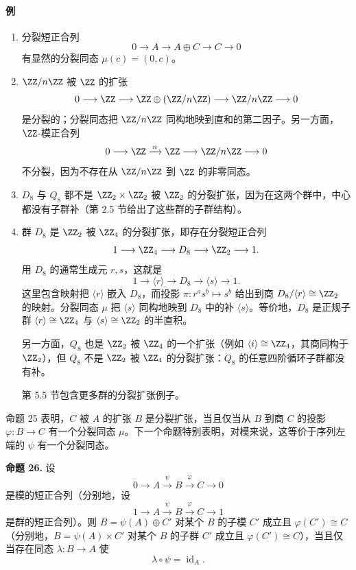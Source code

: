 \paragraph{例}
\begin{enumerate}[label=(\arabic*)]
\item 分裂短正合列
\[
0\longrightarrow A\longrightarrow A\oplus C\longrightarrow C\longrightarrow0
\]
有显然的分裂同态 $\mu(c)=(0,c)$。

\item $\ZZ/n\ZZ$ 被 $\ZZ$ 的扩张
\[
0\longrightarrow \ZZ\longrightarrow \ZZ\oplus(\ZZ/n\ZZ)\longrightarrow \ZZ/n\ZZ\longrightarrow0
\]
是分裂的；分裂同态把 $\ZZ/n\ZZ$ 同构地映到直和的第二因子。另一方面，$\ZZ$-模正合列
\[
0\longrightarrow \ZZ\xrightarrow{\,n\,}\ZZ\longrightarrow\ZZ/n\ZZ\longrightarrow0
\]
不分裂，因为不存在从 $\ZZ/n\ZZ$ 到 $\ZZ$ 的非零同态。

\item $D_8$ 与 $Q_8$ 都不是 $\ZZ_2\times\ZZ_2$ 被 $\ZZ_2$ 的分裂扩张，因为在这两个群中，中心都没有子群补（第 2.5 节给出了这些群的子群结构）。

\item 群 $D_8$ 是 $\ZZ_2$ 被 $\ZZ_4$ 的分裂扩张，即存在分裂短正合列
\[
1\longrightarrow \ZZ_4\longrightarrow D_8\longrightarrow\ZZ_2\longrightarrow1.
\]
用 $D_8$ 的通常生成元 $r,s$，这就是
\[
1\longrightarrow\langle r\rangle\longrightarrow D_8\longrightarrow\langle s\rangle\longrightarrow1.
\]
这里包含映射把 $\langle r\rangle$ 嵌入 $D_8$，而投影 $\pi:r^as^b\mapsto s^b$ 给出到商 $D_8/\langle r\rangle\cong\ZZ_2$ 的映射。分裂同态 $\mu$ 把 $\langle s\rangle$ 同构地映到 $D_8$ 中的补 $\langle s\rangle$。等价地，$D_8$ 是正规子群 $\langle r\rangle\cong\ZZ_4$ 与 $\langle s\rangle\cong\ZZ_2$ 的半直积。

另一方面，$Q_8$ 也是 $\ZZ_2$ 被 $\ZZ_4$ 的一个扩张（例如 $\langle i\rangle\cong\ZZ_4$，其商同构于 $\ZZ_2$），但 $Q_8$ 不是 $\ZZ_2$ 被 $\ZZ_4$ 的分裂扩张：$Q_8$ 的任意四阶循环子群都没有补。

第 5.5 节包含更多群的分裂扩张例子。
\end{enumerate}

命题 25 表明，$C$ 被 $A$ 的扩张 $B$ 是分裂扩张，当且仅当从 $B$ 到商 $C$ 的投影 $\varphi:B\to C$ 有一个分裂同态 $\mu$。下一个命题特别表明，对模来说，这等价于序列左端的 $\psi$ 有一个分裂同态。

\noindent\textbf{命题 26.} 设
\[
0\longrightarrow A\xrightarrow{\psi}B\xrightarrow{\varphi}C\longrightarrow0
\]
是模的短正合列（分别地，设
\[
1\longrightarrow A\xrightarrow{\psi}B\xrightarrow{\varphi}C\longrightarrow1
\]
是群的短正合列）。则 $B=\psi(A)\oplus C'$ 对某个 $B$ 的子模 $C'$ 成立且 $\varphi(C')\cong C$（分别地，$B=\psi(A)\times C'$ 对某个 $B$ 的子群 $C'$ 成立且 $\varphi(C')\cong C$），当且仅当存在同态 $\lambda:B\to A$ 使
\[
\lambda\circ\psi=\operatorname{id}_A.
\]

